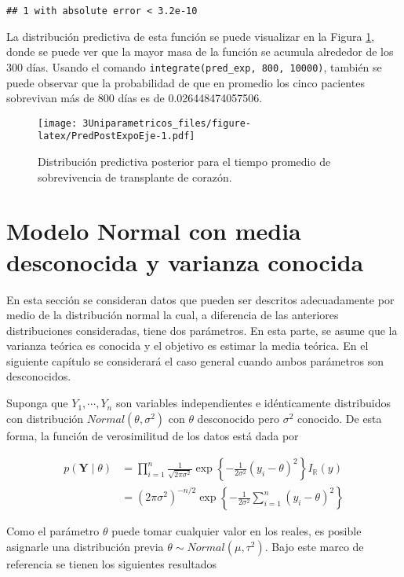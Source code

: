 \documentclass[
  10pt,
  spanish,
]{book}
\theoremstyle{definition}
\theoremstyle{definition}
\theoremstyle{definition}
\theoremstyle{definition}
\theoremstyle{remark}
\begin{document}
\begin{verbatim}
## 1 with absolute error < 3.2e-10
\end{verbatim}

La distribución predictiva de esta función se puede visualizar en la Figura \ref{fig:PredPostExpoEje}, donde se puede ver que la mayor masa de la función se acumula alrededor de los 300 días. Usando el comando \texttt{integrate(pred\_exp,\ 800,\ 10000)}, también se puede observar que la probabilidad de que en promedio los cinco pacientes sobrevivan más de 800 días es de 0.026448474057506.

\begin{figure}
\centering
\texttt{[image: 3Uniparametricos\_files/figure-latex/PredPostExpoEje-1.pdf]}
\caption{\label{fig:PredPostExpoEje}Distribución predictiva posterior para el tiempo promedio de sobrevivencia de transplante de corazón.}
\end{figure}

\hypertarget{modelo-normal-con-media-desconocida-y-varianza-conocida}{%
\section{Modelo Normal con media desconocida y varianza conocida}\label{modelo-normal-con-media-desconocida-y-varianza-conocida}}

En esta sección se consideran datos que pueden ser descritos adecuadamente por medio de la distribución normal la cual, a diferencia de las anteriores distribuciones consideradas, tiene dos parámetros. En esta parte, se asume que la varianza teórica es conocida y el objetivo es estimar la media teórica. En el siguiente capítulo se considerará el caso general cuando ambos parámetros son desconocidos.

Suponga que \(Y_1,\cdots,Y_n\) son variables independientes e idénticamente distribuidos con distribución \(Normal(\theta,\sigma^2)\) con \(\theta\) desconocido pero \(\sigma^2\) conocido. De esta forma, la función de verosimilitud de los datos está dada por

\begin{align*}
p(\mathbf{Y} \mid \theta)&=\prod_{i=1}^n\frac{1}{\sqrt{2\pi\sigma^2}}\exp\left\{-\frac{1}{2\sigma^2}(y_i-\theta)^2\right\}I_\mathbb{R}(y)\\
&=(2\pi\sigma^2)^{-n/2}\exp\left\{-\frac{1}{2\sigma^2}\sum_{i=1}^n(y_i-\theta)^2\right\}
\end{align*}

Como el parámetro \(\theta\) puede tomar cualquier valor en los reales, es posible asignarle una distribución previa \(\theta \sim Normal(\mu,\tau^2)\). Bajo este marco de referencia se tienen los siguientes resultados
\end{document}
